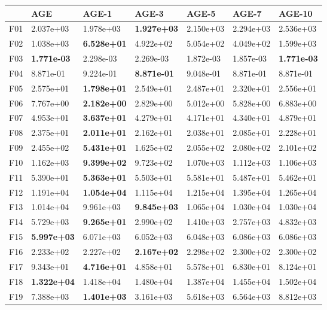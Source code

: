 \begin{tabular}{lllllll}
\toprule
{} & AGE & AGE-1 & AGE-3 & AGE-5 & AGE-7 & AGE-10 \\
\midrule
F01 & 2.037e+03 & 1.978e+03 & \textbf{1.927e+03} & 2.150e+03 & 2.294e+03 & 2.536e+03 \\
F02 & 1.038e+03 & \textbf{6.528e+01} & 4.922e+02 & 5.054e+02 & 4.049e+02 & 1.599e+03 \\
F03 & \textbf{1.771e-03} & 2.298e-03 & 2.269e-03 & 1.872e-03 & 1.857e-03 & \textbf{1.771e-03} \\
F04 & 8.871e-01 & 9.224e-01 & \textbf{8.871e-01} & 9.048e-01 & 8.871e-01 & 8.871e-01 \\
F05 & 2.575e+01 & \textbf{1.798e+01} & 2.549e+01 & 2.487e+01 & 2.320e+01 & 2.556e+01 \\
F06 & 7.767e+00 & \textbf{2.182e+00} & 2.829e+00 & 5.012e+00 & 5.828e+00 & 6.883e+00 \\
F07 & 4.953e+01 & \textbf{3.637e+01} & 4.279e+01 & 4.171e+01 & 4.340e+01 & 4.879e+01 \\
F08 & 2.375e+01 & \textbf{2.011e+01} & 2.162e+01 & 2.038e+01 & 2.085e+01 & 2.228e+01 \\
F09 & 2.455e+02 & \textbf{5.431e+01} & 1.625e+02 & 2.055e+02 & 2.080e+02 & 2.101e+02 \\
F10 & 1.162e+03 & \textbf{9.399e+02} & 9.723e+02 & 1.070e+03 & 1.112e+03 & 1.106e+03 \\
F11 & 5.390e+01 & \textbf{5.363e+01} & 5.503e+01 & 5.581e+01 & 5.487e+01 & 5.462e+01 \\
F12 & 1.191e+04 & \textbf{1.054e+04} & 1.115e+04 & 1.215e+04 & 1.395e+04 & 1.265e+04 \\
F13 & 1.014e+04 & 9.961e+03 & \textbf{9.845e+03} & 1.065e+04 & 1.030e+04 & 1.030e+04 \\
F14 & 5.729e+03 & \textbf{9.265e+01} & 2.990e+02 & 1.410e+03 & 2.757e+03 & 4.832e+03 \\
F15 & \textbf{5.997e+03} & 6.071e+03 & 6.052e+03 & 6.048e+03 & 6.086e+03 & 6.086e+03 \\
F16 & 2.233e+02 & 2.227e+02 & \textbf{2.167e+02} & 2.298e+02 & 2.300e+02 & 2.300e+02 \\
F17 & 9.343e+01 & \textbf{4.716e+01} & 4.858e+01 & 5.578e+01 & 6.830e+01 & 8.124e+01 \\
F18 & \textbf{1.322e+04} & 1.418e+04 & 1.480e+04 & 1.387e+04 & 1.455e+04 & 1.502e+04 \\
F19 & 7.388e+03 & \textbf{1.401e+03} & 3.161e+03 & 5.618e+03 & 6.564e+03 & 8.812e+03 \\

\end{tabular}

